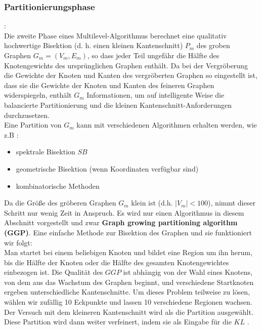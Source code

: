 \documentclass[runningheads]{llncs}
\begin{document}
\subsubsection{Partitionierungsphase}:\\
Die zweite Phase eines Multilevel-Algorithmus berechnet
eine qualitativ hochwertige Bisektion (d. h. einen kleinen Kantenschnitt) $P_m$ des groben Graphen $G_m = (V_m, E_m)$,
so dass jeder Teil ungefähr die Hälfte des Knotengewichts des ursprünglichen Graphen enthält. Da bei der Vergröberung die Gewichte der Knoten und Kanten des vergröberten Graphen so eingestellt ist, dass sie die Gewichte der Knoten und Kanten des feineren Graphen widerspiegeln, enthält $G_m$ Informationen, um auf intelligente Weise die balancierte Partitionierung und die kleinen Kantenschnitt-Anforderungen durchzusetzen.\\
Eine Partition von $G_m$ kann mit verschiedenen Algorithmen erhalten werden, wie z.B \cite{karypis1998fast}:
\begin{itemize}
	\item spektrale Bisektion $SB$
	\item geometrische Bisektion (wenn Koordinaten verfügbar sind)
	\item kombinatorische Methoden
\end{itemize}
Da die Größe des
gröberen Graphen $G_m$ klein ist (d.h. $\lvert V_m \lvert < 100$), nimmt dieser Schritt nur wenig Zeit in Anspruch.
Es wird nur einen Algorithmus in diesem Abschnitt vorgestellt und zwar \textbf{Graph growing partitioning algorithm (GGP)}. Eine einfache Methode zur Bisektion des Graphen und sie funktioniert wir folgt:\\
Man startet bei einem beliebigen Knoten und bildet eine Region um ihn herum, bis die Hälfte der Knoten oder die Hälfte des gesamten Knotengewichtes einbezogen ist. Die Qualität des $GGP$ ist abhängig von der Wahl eines Knotens, von dem aus das Wachstum des Graphen beginnt, und verschiedene Startknoten ergeben unterschiedliche Kantenschnitte.  
 Um dieses Problem teilweise zu lösen, wählen wir zufällig 10 Eckpunkte
und lassen 10 verschiedene Regionen wachsen. Der Versuch mit dem kleineren Kantenschnitt wird als
die Partition ausgewählt. Diese Partition wird dann weiter verfeinert, indem sie als Eingabe für die $KL$ \cite{karypis1998fast}.
\end{document}
